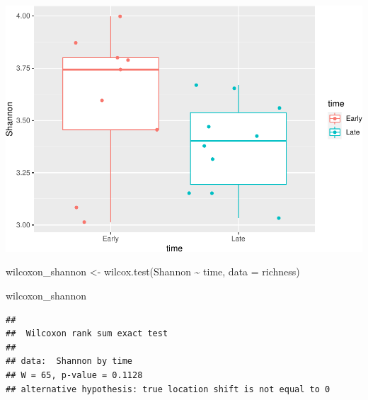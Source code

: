 \documentclass[
]{book}
\newenvironment{Shaded}{\begin{snugshade}}{\end{snugshade}}
\newcommand{\AttributeTok}[1]{\textcolor[rgb]{0.77,0.63,0.00}{#1}}
\newcommand{\FunctionTok}[1]{\textcolor[rgb]{0.00,0.00,0.00}{#1}}
\newcommand{\NormalTok}[1]{#1}
\newcommand{\OtherTok}[1]{\textcolor[rgb]{0.56,0.35,0.01}{#1}}
\newcommand{\SpecialCharTok}[1]{\textcolor[rgb]{0.00,0.00,0.00}{#1}}
\begin{document}
\begin{Shaded}
\end{Shaded}

\includegraphics{16sworkshop_files/figure-latex/alpha diversit-1.pdf}

\begin{Shaded}
\begin{Highlighting}[]
\NormalTok{wilcoxon\_shannon }\OtherTok{\textless{}{-}} \FunctionTok{wilcox.test}\NormalTok{(Shannon }\SpecialCharTok{\textasciitilde{}}\NormalTok{ time, }\AttributeTok{data =}\NormalTok{ richness)}

\NormalTok{wilcoxon\_shannon}
\end{Highlighting}
\end{Shaded}

\begin{verbatim}
## 
##  Wilcoxon rank sum exact test
## 
## data:  Shannon by time
## W = 65, p-value = 0.1128
## alternative hypothesis: true location shift is not equal to 0
\end{verbatim}
\end{document}

